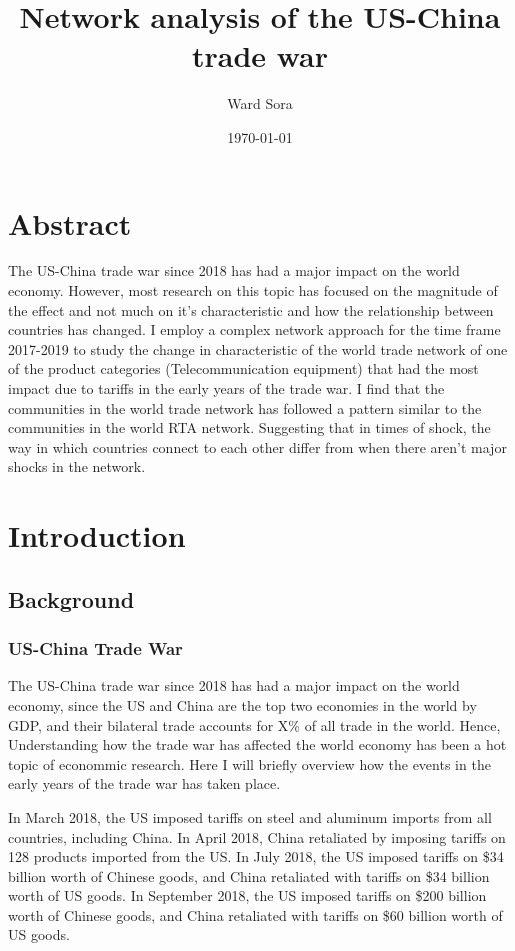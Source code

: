 \documentclass[a4paper, 12pt]{article}
\title{Network analysis of the US-China trade war}
\author{Ward Sora}
\date{\today}
\begin{document}
%
\maketitle

%
\newpage
\section*{Abstract}
The US-China trade war since 2018 has had a major impact on the world economy.
However, most research on this topic has focused on the magnitude of the effect and not much on it's characteristic and how the relationship between countries has changed.
I employ a complex network approach for the time frame 2017-2019 to study the change in characteristic of the world trade network of one of the product categories (Telecommunication equipment) that had the most impact due to tariffs in the early years of the trade war.
I find that the communities in the world trade network has followed a pattern similar to the communities in the world RTA network.
Suggesting that in times of shock, the way in which countries connect to each other differ from when there aren't major shocks in the network.
\newpage
%
\tableofcontents
\newpage
%
\section{Introduction}

\subsection{Background}

\subsubsection{US-China Trade War}
The US-China trade war since 2018 has had a major impact on the world economy, since the US and China are the top two economies in the world by GDP, and their bilateral trade accounts for X\% of all trade in the world.
Hence, Understanding how the trade war has affected the world economy has been a hot topic of econommic research.
Here I will briefly overview how the events in the early years of the trade war has taken place.
\par
In March 2018, the US imposed tariffs on steel and aluminum imports from all countries, including China.
In April 2018, China retaliated by imposing tariffs on 128 products imported from the US.
In July 2018, the US imposed tariffs on \$34 billion worth of Chinese goods, and China retaliated with tariffs on \$34 billion worth of US goods.
In September 2018, the US imposed tariffs on \$200 billion worth of Chinese goods, and China retaliated with tariffs on \$60 billion worth of US goods.
\end{document}
